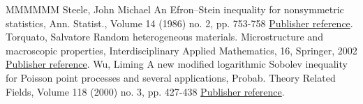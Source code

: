 \begin{thebibliography}{MMMMMM}
 Steele, John Michael An Efron–Stein inequality for nonsymmetric statistics, Ann. Statist., Volume 14 (1986) no. 2, pp. 753-758 \href{https://ahl.centre-mersenne.org/item/AHL_2020__3__825_0/#Steele-86}{Publisher reference}.
 Torquato, Salvatore Random heterogeneous materials. Microstructure and macroscopic properties, Interdisciplinary Applied Mathematics, 16, Springer, 2002 \href{https://ahl.centre-mersenne.org/item/AHL_2020__3__825_0/#Torquato-02}{Publisher reference}.
 Wu, Liming A new modified logarithmic Sobolev inequality for Poisson point processes and several applications, Probab. Theory Related Fields, Volume 118 (2000) no. 3, pp. 427-438 \href{https://ahl.centre-mersenne.org/item/AHL_2020__3__825_0/#Wu00}{Publisher reference}.
\end{thebibliography}
